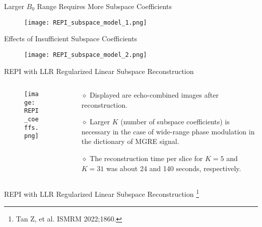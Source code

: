 \begin{frame}{Larger $B_0$ Range Requires More Subspace Coefficients}
\begin{figure}
	\texttt{[image: REPI\_subspace\_model\_1.png]}
\end{figure}
\end{frame}


\begin{frame}{Effects of Insufficient Subspace Coefficients}
\begin{figure}
	\texttt{[image: REPI\_subspace\_model\_2.png]}
\end{figure}
\end{frame}


\begin{frame}{REPI with LLR Regularized Linear Subspace Reconstruction}
\begin{columns}
\begin{column}{0.45\textwidth}
\begin{figure}
	\texttt{[image: REPI\_coeffs.png]}
\end{figure}
\end{column}

\begin{column}{0.55\textwidth}
{\large
\begin{itemize}
	\item [$\diamond$] Displayed are echo-combined images after reconstruction.
	\vspace{2em}
	\item [$\diamond$] Larger $K$ (number of subspace coefficients) is necessary 
	in the case of wide-range phase modulation in the dictionary of MGRE signal. 
	\vspace{2em}
	\item [$\diamond$] The reconstruction time per slice for $K = 5$ and $K = 31$ 
	was about 24 and 140 seconds, respectively.
\end{itemize}}

\end{column}
\end{columns}

\end{frame}


\begin{frame}{REPI with LLR Regularized Linear Subspace Reconstruction
	\footnote{Tan Z, et al. ISMRM 2022;1860.}}

\end{frame}



